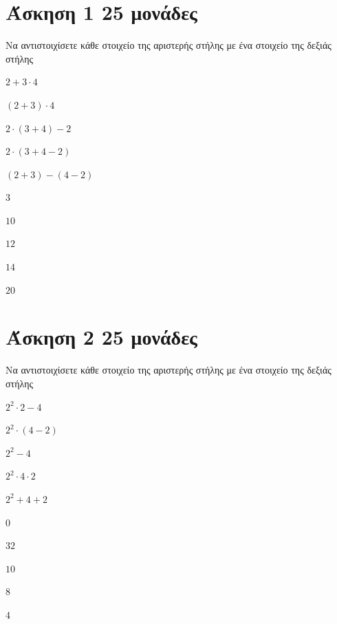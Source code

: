 \documentclass[a4paper,10pt]{report}
\begin{document}
\section*{Άσκηση 1  \hfill \small{}25  μονάδες}
Να αντιστοιχίσετε κάθε στοιχείο της αριστερής στήλης με ένα στοιχείο της δεξιάς στήλης
\begin{itemize}
\begin{multicols}{2}
 \item $2+3\cdot4$
 \item $(2+3)\cdot4$
 \item $2\cdot(3+4)-2$
 \item $2\cdot (3+4-2)$
 \item $(2+3)-(4-2)$
 \item $3$
 \item $10$
 \item $12$
 \item $14$
 \item $20$
\end{multicols}
\end{itemize}


\section*{Άσκηση 2  \hfill \small{}25  μονάδες}
Να αντιστοιχίσετε κάθε στοιχείο της αριστερής στήλης με ένα στοιχείο της δεξιάς στήλης
\begin{itemize}
\begin{multicols}{2}
 \item $2^{2}\cdot2-4$
 \item $2^{2}\cdot(4-2)$
 \item $2^{2}-4$
 \item $2^{2}\cdot4\cdot2$
 \item $2^{2}+4+2$
 \item $0$
 \item $32$
 \item $10$
 \item $8$
 \item $4$
\end{multicols}
\end{itemize}
\end{document}
